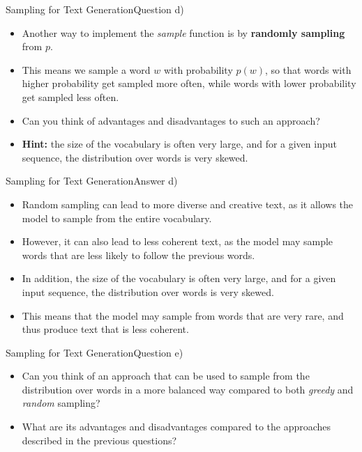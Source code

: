 \documentclass[t]{beamer}
\begin{document}
\begin{frame}{Sampling for Text Generation}{Question d)}
    \begin{itemize}
        \item Another way to implement the \emph{sample} function is by
              \textbf{randomly sampling} from $p$.
        \item This means we sample a word $w$ with probability $p(w)$, so that
              words with higher probability get sampled more often, while words
              with lower probability get sampled less often.
        \item Can you think of advantages and disadvantages to such an approach?
        \item \textbf{Hint:} the size of the vocabulary is often very large, and
              for a given input sequence, the distribution over words is very
              skewed.
    \end{itemize}
\end{frame}

\begin{frame}{Sampling for Text Generation}{Answer d)}
    \begin{itemize}
        \item Random sampling can lead to more diverse and creative text, as it
              allows the model to sample from the entire vocabulary.
        \item However, it can also lead to less coherent text, as the model may
              sample words that are less likely to follow the previous words.
        \item In addition, the size of the vocabulary is often very large, and
              for a given input sequence, the distribution over words is very
              skewed.
        \item This means that the model may sample from words that are very
              rare, and thus produce text that is less coherent.
    \end{itemize}
\end{frame}

\begin{frame}{Sampling for Text Generation}{Question e)}
    \begin{itemize}
        \item Can you think of an approach that can be used to sample from the
              distribution over words in a more balanced way compared to both
              \emph{greedy} and \emph{random} sampling?
        \item What are its advantages and disadvantages compared to the
              approaches described in the previous questions?
    \end{itemize}
\end{frame}
\end{document}
